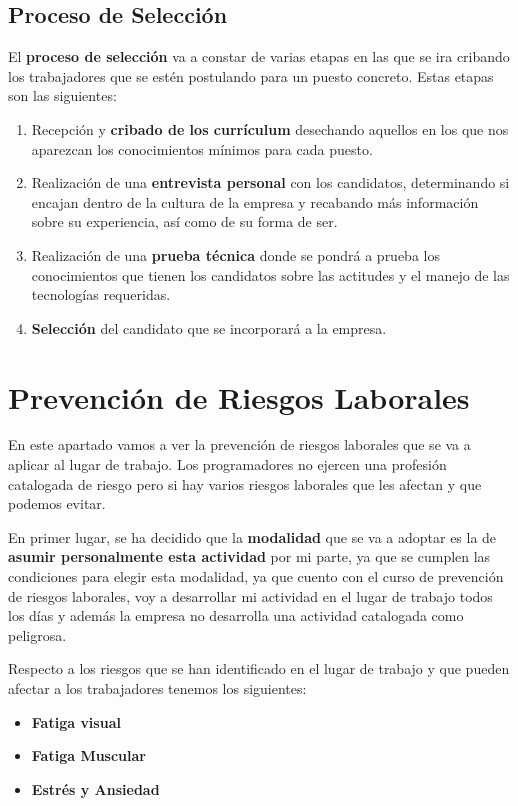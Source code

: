 \subsection{Proceso de Selección}
El \textbf{proceso de selección} va a constar de varias etapas en las que se ira cribando los trabajadores que se estén postulando para un puesto concreto. Estas etapas son las siguientes:

\begin{enumerate}
    \item Recepción y \textbf{cribado de los currículum} desechando aquellos en los que nos aparezcan los conocimientos mínimos para cada puesto.
    \item Realización de una \textbf{entrevista personal} con los candidatos, determinando si encajan dentro de la cultura de la empresa y recabando más información sobre su experiencia, así como de su forma de ser.
    \item Realización de una \textbf{prueba técnica} donde se pondrá a prueba los conocimientos que tienen los candidatos sobre las actitudes y el manejo de las tecnologías requeridas.
    \item \textbf{Selección} del candidato que se incorporará a la empresa.
\end{enumerate}

\section{Prevención de Riesgos Laborales}
En este apartado vamos a ver la prevención de riesgos laborales que se va a aplicar al lugar de trabajo. Los programadores no ejercen una profesión catalogada de riesgo pero si hay varios riesgos laborales que les afectan y que podemos evitar.

En primer lugar, se ha decidido que la \textbf{modalidad} que se va a adoptar es la de \textbf{asumir personalmente esta actividad} por mi parte, ya que se cumplen las condiciones para elegir esta modalidad, ya que cuento con el curso de prevención de riesgos laborales, voy a desarrollar mi actividad en el lugar de trabajo todos los días y además la empresa no desarrolla una actividad catalogada como peligrosa.

Respecto a los riesgos que se han identificado en el lugar de trabajo y que pueden afectar a los trabajadores tenemos los siguientes:

\begin{itemize}
    \item \textbf{Fatiga visual}
    \item \textbf{Fatiga Muscular}
    \item \textbf{Estrés y Ansiedad}
\end{itemize}


